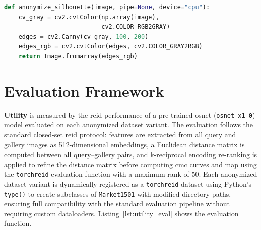 \begin{lstlisting}[language=Python, caption={Level~4 edge silhouette (\texttt{silhouette\_anonymizer.py}).}, label=lst:edge]
def anonymize_silhouette(image, pipe=None, device="cpu"):
    cv_gray = cv2.cvtColor(np.array(image),
                           cv2.COLOR_RGB2GRAY)
    edges = cv2.Canny(cv_gray, 100, 200)
    edges_rgb = cv2.cvtColor(edges, cv2.COLOR_GRAY2RGB)
    return Image.fromarray(edges_rgb)
\end{lstlisting}


\section{Evaluation Framework}

\textbf{Utility} is measured by the \acrshort{reid} performance of a pre-trained \acrshort{osnet} (\texttt{osnet\_x1\_0}) model evaluated on each anonymized dataset variant. The evaluation follows the standard closed-set \acrshort{reid} protocol: features are extracted from all query and gallery images as 512-dimensional embeddings, a Euclidean distance matrix is computed between all query--gallery pairs, and k-reciprocal encoding re-ranking \cite{zhong2017reranking} is applied to refine the distance matrix before computing \acrshort{cmc} curves and \acrshort{map} using the \texttt{torchreid} evaluation function with a maximum rank of 50. Each anonymized dataset variant is dynamically registered as a \texttt{torchreid} dataset using Python's \texttt{type()} to create subclasses of \texttt{Market1501} with modified directory paths, ensuring full compatibility with the standard evaluation pipeline without requiring custom dataloaders. Listing~\ref{lst:utility_eval} shows the evaluation function.


